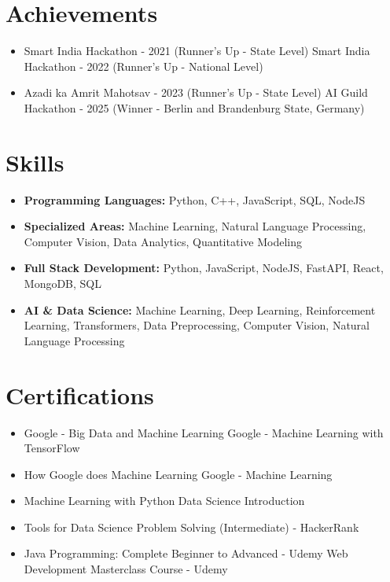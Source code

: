 \documentclass[a4paper,10pt]{article}
\begin{document}
\section*{Achievements}
\begin{itemize}
\item Smart India Hackathon - 2021 (Runner's Up - State Level) \hfill Smart India Hackathon - 2022 (Runner's Up - National Level)
\item Azadi ka Amrit Mahotsav - 2023 (Runner's Up - State Level) \hfill AI Guild Hackathon - 2025 (Winner - Berlin and Brandenburg State, Germany)
\end{itemize}

\section*{Skills}
\begin{itemize}
  \item \textbf{Programming Languages:} Python, C++, JavaScript, SQL, NodeJS
  \item \textbf{Specialized Areas:} Machine Learning, Natural Language Processing, Computer Vision, Data Analytics, Quantitative Modeling
  \item \textbf{Full Stack Development:} Python, JavaScript, NodeJS, FastAPI, React, MongoDB, SQL
  \item \textbf{AI \& Data Science:} Machine Learning, Deep Learning, Reinforcement Learning, Transformers, Data Preprocessing, Computer Vision, Natural Language Processing
\end{itemize}

\section*{Certifications}
\begin{itemize}
\item Google - Big Data and Machine Learning \hfill Google - Machine Learning with TensorFlow
\item How Google does Machine Learning \hfill Google - Machine Learning
\item Machine Learning with Python \hfill Data Science Introduction
\item Tools for Data Science \hfill Problem Solving (Intermediate) - HackerRank
\item Java Programming: Complete Beginner to Advanced - Udemy \hfill Web Development Masterclass Course - Udemy
\end{itemize}
\end{document}
